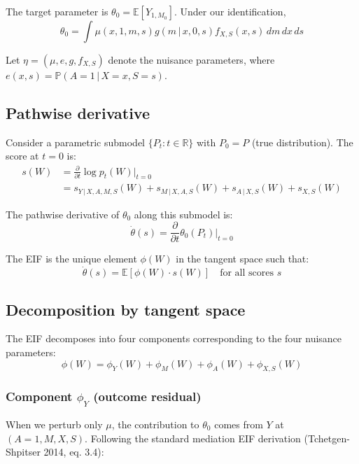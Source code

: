 \documentclass[11pt]{article}
\theoremstyle{plain}
\theoremstyle{definition}
\theoremstyle{remark}
\newcommand{\E}{\mathbb{E}}
\newcommand{\P}{\mathbb{P}}
\newcommand{\given}{\,|\,}
\newcommand{\R}{\mathbb{R}}
\begin{document}
The target parameter is $\theta_0 = \E[Y_{1, M_0}]$. Under our identification,
\begin{equation}
    \theta_0 = \int \mu(x, 1, m, s) g(m \given x, 0, s) f_{X, S}(x, s) \, dm \, dx \, ds
\end{equation}

Let $\eta = (\mu, e, g, f_{X,S})$ denote the nuisance parameters, where $e(x, s) = \P(A=1 \given X=x, S=s)$.

\subsection{Pathwise derivative}

Consider a parametric submodel $\{P_t : t \in \R\}$ with $P_0 = P$ (true distribution). The score at $t = 0$ is:
\begin{align}
    s(W) &= \frac{\partial}{\partial t}\log p_t(W) \Big|_{t=0} \\
    &= s_{Y \given X,A,M,S}(W) + s_{M \given X,A,S}(W) + s_{A \given X,S}(W) + s_{X,S}(W)
\end{align}

The pathwise derivative of $\theta_0$ along this submodel is:
\begin{equation}
    \dot\theta(s) = \frac{\partial}{\partial t} \theta_0(P_t) \Big|_{t=0}
\end{equation}

The EIF is the unique element $\phi(W)$ in the tangent space such that:
\begin{equation}
    \dot\theta(s) = \E[\phi(W) \cdot s(W)] \quad \text{for all scores } s
\end{equation}

\subsection{Decomposition by tangent space}

The EIF decomposes into four components corresponding to the four nuisance parameters:
\begin{equation}
    \phi(W) = \phi_Y(W) + \phi_M(W) + \phi_A(W) + \phi_{X,S}(W)
\end{equation}

\subsubsection{Component $\phi_Y$ (outcome residual)}

When we perturb only $\mu$, the contribution to $\theta_0$ comes from $Y$ at $(A=1, M, X, S)$. Following the standard mediation EIF derivation (Tchetgen-Shpitser 2014, eq. 3.4):
\end{document}
